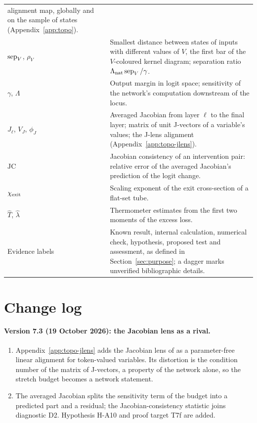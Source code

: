\documentclass[11pt,a4paper]{article}
\begin{document}
\begin{longtable}{@{}P{3.2cm}P{11.7cm}@{}}
alignment map, globally and on the sample of states
(Appendix~\ref{app:topo}). \\ \addlinespace
$\operatorname{sep}_V$, $\rho_V$ & Smallest distance between states of inputs with
different values of $V$, the first bar of the $V$-coloured kernel diagram;
separation ratio $\Lambda_{\rm nat}\operatorname{sep}_V/\gamma$. \\ \addlinespace
$\gamma$, $\Lambda$ & Output margin in logit space; sensitivity of the
network's computation downstream of the locus. \\ \addlinespace
$J_\ell$, $V_J$, $\phi_J$ & Averaged Jacobian from layer $\ell$ to the final
layer; matrix of unit J-vectors of a variable's values; the J-lens
alignment (Appendix~\ref{app:topo-jlens}). \\ \addlinespace
$\mathrm{JC}$ & Jacobian consistency of an intervention pair: relative
error of the averaged Jacobian's prediction of the logit change. \\
\addlinespace
$\chi_{\rm exit}$ & Scaling exponent of the exit cross-section of a
flat-set tube. \\ \addlinespace
$\hat T$, $\hat\lambda$ & Thermometer estimates from the first two
moments of the excess loss. \\ \addlinespace
Evidence labels & Known result, internal calculation, numerical check,
hypothesis, proposed test and assessment, as defined in
Section~\ref{sec:purpose}; a dagger marks unverified bibliographic
details. \\
\bottomrule
\end{longtable}

\section{Change log}

\paragraph{Version 7.3 (19 October 2026): the Jacobian lens as a rival.}
\begin{enumerate}[leftmargin=*]
\item Appendix~\ref{app:topo-jlens} adds the Jacobian lens of
\cite{gurnee2026workspace} as a parameter-free linear alignment for
token-valued variables. Its distortion is the condition number of the
matrix of J-vectors, a property of the network alone, so the stretch budget
becomes a network statement.
\item The averaged Jacobian splits the sensitivity term of the budget into a
predicted part and a residual; the Jacobian-consistency statistic joins
diagnostic D2. Hypothesis H-A10 and proof target T7f are added.
\end{enumerate}
\end{document}
